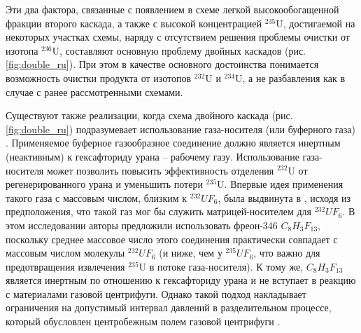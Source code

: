 Эти два фактора, связанные с появлением в схеме легкой высокообогащенной фракции второго каскада, а также с высокой концентрацией $^{235}$U, достигаемой на некоторых участках схемы, наряду с отсутствием решения проблемы очистки от изотопа $^{236}$U, составляют основную проблему двойных каскадов (рис. \ref{fig:double_ru}). При этом в качестве основного достоинства понимается возможность очистки продукта от изотопов $^{232}$U и $^{234}$U, а не разбавления как в случае с ранее рассмотренными схемами.


Существуют также реализации, когда схема двойного каскада (рис. \ref{fig:double_ru}) подразумевает использование газа-носителя (или буферного газа) \cite{prusakovCorrectingIsotopicComposition2008, SposobIzotopnogoVosstanovleniyab}. Применяемое буферное газообразное соединение должно является инертным (неактивным) к гексафториду урана -- рабочему газу. Использование газа-носителя может позволить повысить эффективность отделения $^{232}$U от регенерированного урана и уменьшить потери $^{235}$U. Впервые идея применения такого газа с массовым числом, близким к $^{232}UF_6$, была выдвинута в \cite{SosninYuChelcov}, исходя из предположения, что такой газ мог бы служить матрицей-носителем для $^{232}UF_6$.
В этом исследовании авторы предложили использовать фреон-346 $C_{8}H_{3}F_{13}$, поскольку среднее массовое число этого соединения практически совпадает с массовым числом молекулы $^{232}UF_6$ (и ниже, чем у $^{235}UF_6$, что важно для предотвращения извлечения $^{235}$U в потоке газа-носителя). К тому же, $C_{8}H_{3}F_{13}$ является инертным по отношению к гексафториду урана и не вступает в реакцию с материалами газовой центрифуги. Однако такой подход накладывает ограничения на допустимый интервал давлений в разделительном процессе, который обусловлен центробежным полем газовой центрифуги \cite{prusakovCorrectingIsotopicComposition2008}.

